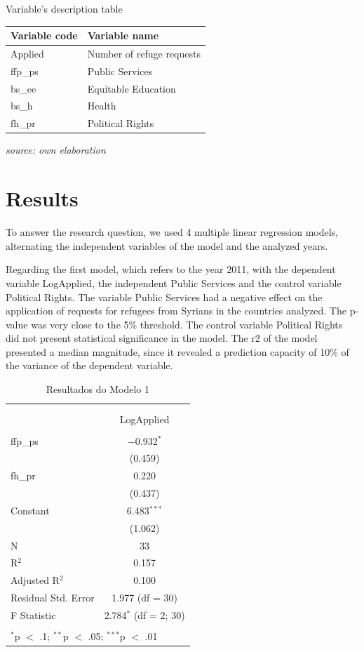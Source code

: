 \documentclass[]{elsarticle} %
\begin{document}
Variable's description table

\begin{longtable}[]{@{}ll@{}}
\toprule
Variable code & Variable name\tabularnewline
\midrule
\endhead
Applied & Number of refuge requests\tabularnewline
ffp\_ps & Public Services\tabularnewline
bs\_ee & Equitable Education\tabularnewline
bs\_h & Health\tabularnewline
fh\_pr & Political Rights\tabularnewline
\bottomrule
\end{longtable}

\emph{source: own elaboration}

\section{Results}\label{results}

To answer the research question, we used 4 multiple linear regression
models, alternating the independent variables of the model and the
analyzed years.

Regarding the first model, which refers to the year 2011, with the
dependent variable LogApplied, the independent Public Services and the
control variable Political Rights. The variable Public Services had a
negative effect on the application of requests for refugees from Syrians
in the countries analyzed. The p-value was very close to the 5\%
threshold. The control variable Political Rights did not present
statistical significance in the model. The r2 of the model presented a
median magnitude, since it revealed a prediction capacity of 10\% of the
variance of the dependent variable.

\begin{table}[!htbp] \centering 
  \caption{Resultados do Modelo 1} 
  \label{} 
\begin{tabular}{@{\extracolsep{5pt}}lc} 
\\[-1.8ex]\hline \\[-1.8ex] 
\\[-1.8ex] & LogApplied \\ 
\hline \\[-1.8ex] 
 ffp\_ps & $-$0.932$^{*}$ \\ 
  & (0.459) \\ 
  fh\_pr & 0.220 \\ 
  & (0.437) \\ 
  Constant & 6.483$^{***}$ \\ 
  & (1.062) \\ 
 N & 33 \\ 
R$^{2}$ & 0.157 \\ 
Adjusted R$^{2}$ & 0.100 \\ 
Residual Std. Error & 1.977 (df = 30) \\ 
F Statistic & 2.784$^{*}$ (df = 2; 30) \\ 
\hline \\[-1.8ex] 
\multicolumn{2}{l}{$^{*}$p $<$ .1; $^{**}$p $<$ .05; $^{***}$p $<$ .01} \\ 
\end{tabular} 
\end{table}
\end{document}
